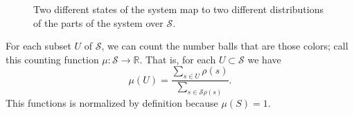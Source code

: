 \documentclass{article}
\begin{document}
\begin{figure}
\begin{center}
\end{center}
\caption{Two different states of the system map to two different distributions of the parts of the system over $\mathcal{S}$.}
\end{figure}
	
	For each subset $U$ of $\mathcal{S}$, we can count the number balls that are those colors; call this counting function $\mu : \mathcal{S} \to \mathbb{R}$. That is, for each $U \subset \mathcal{S}$ we have $$\mu(U) = \frac{\sum_{s \in U} \rho(s)}{\sum_{s \in \mathcal{S} \rho(s)}}.$$ This functions is normalized by definition because $\mu(S) = 1$.
	
\end{document}
